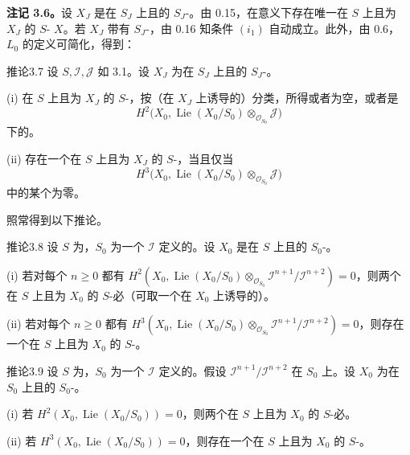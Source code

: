 \textbf{注记 3.6。}设 $X_J$ 是在 $S_J$ 上且的 $S_J$-。由 0.15，在意义下存在唯一在 $S$ 上且为 $X_J$ 的 $S$- $X$。若 $X_J$ 带有 $S_J$-，由 0.16 知条件 $(i_1)$ 自动成立。此外，由 0.6，$L_0$ 的定义可简化，得到：
\begin{SGAresult}{推论}{3.7}
设 $S,\mathcal I,\mathcal J$ 如 3.1。设 $X_J$ 为在 $S_J$ 上且的 $S_J$-。

(i) 在 $S$ 上且为 $X_J$ 的 $S$-，按（在 $X_J$ 上诱导的）分类，所得或者为空，或者是
\[
 H^2\bigl(X_0,\operatorname{Lie}(X_0/S_0)\otimes_{\mathcal O_{S_0}}\mathcal J\bigr)
\]
下的。

(ii) 存在一个在 $S$ 上且为 $X_J$ 的 $S$-，当且仅当
\[
 H^3\bigl(X_0,\operatorname{Lie}(X_0/S_0)\otimes_{\mathcal O_{S_0}}\mathcal J\bigr)
\]
中的某个为零。
\end{SGAresult}
照常得到以下推论。
\begin{SGAresult}{推论}{3.8}
设 $S$ 为，$S_0$ 为一个 $\mathcal I$ 定义的。设 $X_0$ 是在 $S$ 上且的 $S_0$-。

(i) 若对每个 $n\geq0$ 都有 $H^2(X_0,\operatorname{Lie}(X_0/S_0)\otimes_{\mathcal O_{S_0}}\mathcal I^{n+1}/\mathcal I^{n+2})=0$，则两个在 $S$ 上且为 $X_0$ 的 $S$-必（可取一个在 $X_0$ 上诱导的）。

(ii) 若对每个 $n\geq0$ 都有 $H^3(X_0,\operatorname{Lie}(X_0/S_0)\otimes_{\mathcal O_{S_0}}\mathcal I^{n+1}/\mathcal I^{n+2})=0$，则存在一个在 $S$ 上且为 $X_0$ 的 $S$-。
\end{SGAresult}
\begin{SGAresult}{推论}{3.9}
设 $S$ 为，$S_0$ 为一个 $\mathcal I$ 定义的。假设 $\mathcal I^{n+1}/\mathcal I^{n+2}$ 在 $S_0$ 上。设 $X_0$ 为在 $S_0$ 上且的 $S_0$-。

(i) 若 $H^2(X_0,\operatorname{Lie}(X_0/S_0))=0$，则两个在 $S$ 上且为 $X_0$ 的 $S$-必。

(ii) 若 $H^3(X_0,\operatorname{Lie}(X_0/S_0))=0$，则存在一个在 $S$ 上且为 $X_0$ 的 $S$-。
\end{SGAresult}
